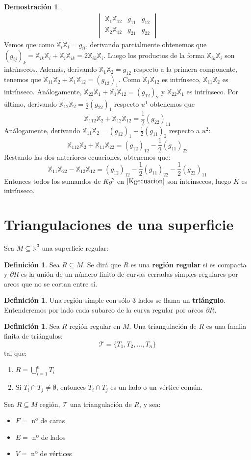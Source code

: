 \documentclass[twoside]{report}
\theoremstyle{definition}
\newtheorem{defi}[theorem]{Definición}
\newtheorem*{dem}{Demostración}
\numberwithin{equation}{section}
\newcommand{\R}{\mathbb{R}}
\newcommand{\X}{\mathbb{X}}
\begin{document}
\begin{dem}
\begin{align}
\begin{vmatrix}
	\X_1 \X_{12} & g_{11} & g_{12}\\
	\X_2 \X_{12} & g_{21} & g_{22}
\end{vmatrix}\label{Kgecuacion}
\end{align}
Vemos que como $\X_i \X_i = g_{ii}$, derivando parcialmente obtenemos que $(g_{ij})_k = \X_{ik}\X_i + \X_i\X_{ik} = 2\X_{ik}\X_i$. Luego los productos de la forma $\X_{ik}\X_i$ son intrínsecos. Además, derivando $\X_1\X_2 = g_{12}$ respecto a la primera componente, tenemos que $\X_{11}\X_2 + \X_1 \X_{12} = (g_{12})_1$. Como $\X_1\X_{12}$ es intrínseco, $\X_{11}\X_2$ es intrínseco. Análogamente, $\X_{22}\X_1 + \X_1 \X_{12} = (g_{12})_2$ y $\X_{22}\X_1$ es intrínseco. Por último, derivando $\X_{12}\X_2=\frac{1}{2}(g_{22})_1$ respecto $u^1$ obtenemos que 
\[\X_{112}\X_2 + \X_{12}\X_{12} = \frac{1}{2}(g_{22})_{11}\]
Análogamente, derivando $\X_{11} \X_2 = (g_{12})_1 - \frac{1}{2}(g_{11})_2$ respecto a $u^2$:
\[ \X_{112}\X_2 + \X_{11}\X_{22} = (g_{12})_{12} - \frac{1}{2}(g_{11})_{22}\]
Restando las dos anteriores ecuaciones, obtenemos que:
\[ \X_{11} \X_{22} - \X_{12}\X_{12} = (g_{12})_{12} - \frac{1}{2} (g_{11})_{22} - \frac{1}{2} (g_{22})_{11} \]
Entonces todos los sumandos de $Kg^2$ en $\eqref{Kgecuacion}$ son intrínsecos, luego $K$ es intrínseco.
\end{dem}

\section{Triangulaciones de una superficie}
Sea $M \subseteq \R^3$ una superficie regular:

\begin{defi}
Sea $R \subseteq M$. Se dirá que $R$ es una \textbf{región regular} si es compacta y $\partial R$ es la unión de un número finito de curvas cerradas simples regulares por arcos que no se cortan entre sí.
\end{defi}

\begin{defi}
Una región simple con sólo 3 lados se llama un \textbf{triángulo}. Entenderemos por lado cada subarco de la curva regular por arcos $\partial R$.
\end{defi}

\begin{defi}
Sea $R$ región regular en $M$. Una triangulación de $R$ es una famlia finita de triángulos:
\[ \mathcal{T} = \{ T_1, T_2, \dots, T_n \} \]
tal que:
\begin{enumerate}
	\item $R = \bigcup_{i=1}^n T_i$
	\item Si $T_i \cap T_j \neq \emptyset$, entonces $T_i \cap T_j$ es un lado o un vértice común.
\end{enumerate}
Sea $R \subseteq M$ región, $\mathcal{T}$ una triangulación de $R$, y sea:
\begin{itemize}
	\item $F =$ nº de caras
	\item $E =$ nº de lados
	\item $V =$ nº de vértices
\end{itemize}
\end{defi}
\end{document}
